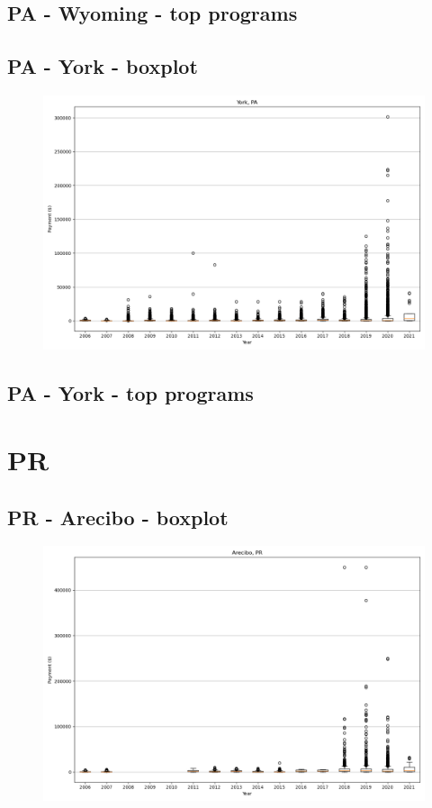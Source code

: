 \subsection*{PA - Wyoming - top programs}

\newpage
\subsection*{PA - York - boxplot}
\begin{figure}[h]
\centering
\includegraphics[width=7in]{../output/boxplots/counties/York-PA_boxplot.png}
\end{figure}


\subsection*{PA - York - top programs}

\newpage
\section*{PR}
\subsection*{PR - Arecibo - boxplot}
\begin{figure}[h]
\centering
\includegraphics[width=7in]{../output/boxplots/counties/Arecibo-PR_boxplot.png}
\end{figure}


